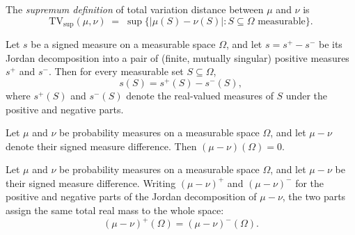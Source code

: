\begin{definition}
\label{CommunicationComplexity.tvDistanceSup}
\leanok
The \emph{supremum definition} of total variation distance between $\mu$ and $\nu$ is
\[
  \mathrm{TV}_{\sup}(\mu,\nu)
  \;=\; \sup\bigl\{|\mu(S) - \nu(S)| : S \subseteq \Omega \text{ measurable}\bigr\}.
\]
\end{definition}

\begin{lemma}
\label{CommunicationComplexity.TVDistance.signedMeasure_apply_eq_posPart_sub_negPart}
\leanok
{}
Let $s$ be a signed measure on a measurable space $\Omega$, and let $s = s^+ - s^-$ be
its Jordan decomposition into a pair of (finite, mutually singular) positive measures
$s^+$ and $s^-$. Then for every measurable set $S \subseteq \Omega$,
\[
s(S) = s^+(S) - s^-(S),
\]
where $s^+(S)$ and $s^-(S)$ denote the real-valued measures of $S$ under the positive
and negative parts.
\end{lemma}

\begin{lemma}
\label{CommunicationComplexity.TVDistance.signedMeasureDiff_univ}
\leanok
{}
Let $\mu$ and $\nu$ be probability measures on a measurable space $\Omega$, and let $\mu
- \nu$ denote their signed measure difference. Then $(\mu - \nu)(\Omega) = 0$.
\end{lemma}

\begin{lemma}
\label{CommunicationComplexity.TVDistance.jordan_posPart_real_univ_eq_negPart_real_univ}
\leanok
{}
Let $\mu$ and $\nu$ be probability measures on a measurable space $\Omega$, and let $\mu
- \nu$ be their signed measure difference. Writing $(\mu-\nu)^{+}$ and $(\mu-\nu)^{-}$
for the positive and negative parts of the Jordan decomposition of $\mu - \nu$, the two
parts assign the same total real mass to the whole space:
\[
(\mu-\nu)^{+}(\Omega) = (\mu-\nu)^{-}(\Omega).
\]
\end{lemma}


